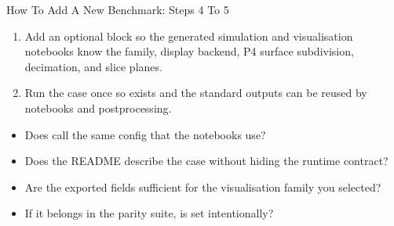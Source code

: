\documentclass[aspectratio=169,10pt]{beamer}
\begin{document}
\begin{frame}{How To Add A New Benchmark: Steps 4 To 5}
\small
\begin{enumerate}
  \item Add an optional \code{[notebook]} block so the generated simulation and visualisation notebooks know the family, display backend, P4 surface subdivision, decimation, and slice planes.
  \item Run the case once so  exists and the standard outputs can be reused by notebooks and postprocessing.
\end{enumerate}
\vspace{0.18cm}
\begin{softbox}
\begin{itemize}
  \item Does  call the same config that the notebooks use?
  \item Does the README describe the case without hiding the runtime contract?
  \item Are the exported fields sufficient for the visualisation family you selected?
  \item If it belongs in the parity suite, is  set intentionally?
\end{itemize}
\end{softbox}
\end{frame}

\end{document}
